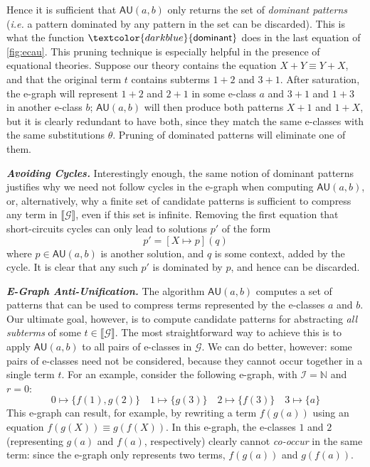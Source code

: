 \documentclass[acmsmall,screen,nonacm,review=false,timestamp=false]{acmart}
\newcommand{\ie}{\emph{i.e.}\xspace}
\newcommand{\emphbf}[1]{\emph{\textbf{#1}\xspace}}
\newcommand{\mypara}[1]{\smallskip\noindent\emphbf{#1.}\xspace}
\newcommand{\semeq}{\equiv}
\newcommand{\gau}{\mathsf{AU}}
\newcommand{\sapp}[2]{{#1}({#2})}
\newcommand{\denot}[1]{\llbracket #1 \rrbracket}
\newcommand{\dominant}{\mathsf{dominant}}
\begin{document}
Hence it is sufficient that $\gau(a,b)$ only returns the set of \emph{dominant patterns}
(\ie a pattern dominated by any pattern in the set can be discarded).
This is what the function $\textcolor{darkblue}{\dominant}$ does in the last equation of \autoref{fig:ecau}.
This pruning technique is especially helpful in the presence of equational theories.
Suppose our theory contains the equation $X + Y \semeq Y + X$,
and that the original term $t$ contains subterms $1 + 2$ and $3 + 1$.
After saturation, the e-graph will represent $1 + 2$ and $2 + 1$ in some e-class $a$
and $3 + 1$ and $1 + 3$ in another e-class $b$;
$\gau(a,b)$ will then produce both patterns $X + 1$ and $1 + X$,
but it is clearly redundant to have both, 
since they match the same e-classes with the same substitutions $\theta$.
Pruning of dominated patterns will eliminate one of them.

\mypara{Avoiding Cycles}
Interestingly enough,
the same notion of dominant patterns justifies why we need not follow cycles in the e-graph when computing $\gau(a,b)$,
or, alternatively, why a finite set of candidate patterns is sufficient
to compress any term in $\denot{\mathcal{G}}$, even if this set is infinite.
Removing the first equation that short-circuits cycles can only lead to solutions $p'$ of the form
$$
p' = \sapp{[X \mapsto p]}{q}
$$
where $p \in \gau(a,b)$ is another solution, and $q$ is some context, added by the cycle.
It is clear that any such $p'$ is dominated by $p$, and hence can be discarded.





\mypara{E-Graph Anti-Unification}
The algorithm $\gau(a,b)$ computes a set of patterns that can be used to compress terms
represented by the e-classes $a$ and $b$.
Our ultimate goal, however, is to compute candidate patterns for abstracting
\emph{all subterms} of some $t \in \denot{\mathcal{G}}$.
The most straightforward way to achieve this is to apply $\gau(a,b)$ to all pairs of e-classes in $\mathcal{G}$.
We can do better, however:
some pairs of e-classes need not be considered,
because they cannot occur together in a single term $t$.
For an example, consider the following e-graph, with $\mathcal{I} = \mathbb{N}$ and $r = 0$:
$$
0 \mapsto \{f(1),g(2)\}\quad 1\mapsto\{g(3)\} \quad 2\mapsto \{f(3)\} \quad 3\mapsto \{a\}
$$
This e-graph can result, for example, by rewriting a term $f(g(a))$
using an equation $f(g(X)) \semeq g(f(X))$.
In this e-graph, the e-classes $1$ and $2$ (representing $g(a)$ and $f(a)$, respectively)
clearly cannot \emph{co-occur} in the same term:
since the e-graph only represents two terms, $f(g(a))$ and $g(f(a))$.
\end{document}
